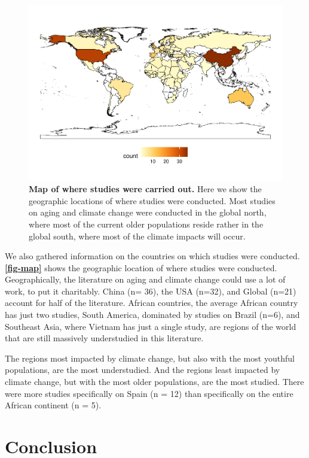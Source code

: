 \documentclass[12pt]{article}
\begin{document}
\begin{figure}
\centering
\includegraphics{MainDocument_files/figure-latex/map-1.pdf}
\caption{\textbf{Map of where studies were carried out.} Here we show
the geographic locations of where studies were conducted. Most studies
on aging and climate change were conducted in the global north, where
most of the current older populations reside rather in the global south,
where most of the climate impacts will occur. \label{fig-map}}
\end{figure}

We also gathered information on the countries on which studies were
conducted. \textbf{\autoref{fig-map}} shows the geographic location of
where studies were conducted. Geographically, the literature on aging
and climate change could use a lot of work, to put it charitably. China
(n= 36), the USA (n=32), and Global (n=21) account for half of the
literature. African countries, the average African country has just two
studies, South America, dominated by studies on Brazil (n=6), and
Southeast Asia, where Vietnam has just a single study, are regions of
the world that are still massively understudied in this literature.

The regions most impacted by climate change, but also with the most
youthful populations, are the most understudied. And the regions least
impacted by climate change, but with the most older populations, are the
most studied. There were more studies specifically on Spain (n = 12)
than specifically on the entire African continent (n = 5).

\hypertarget{conclusion}{%
\section{Conclusion}\label{conclusion}}
\end{document}
